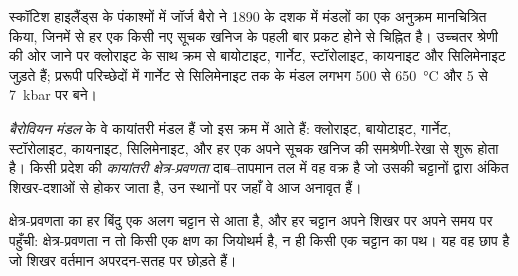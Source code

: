 स्कॉटिश हाइलैंड्स के पंकाश्मों में जॉर्ज बैरो ने 1890 के दशक में मंडलों का एक अनुक्रम
मानचित्रित किया, जिनमें से हर एक किसी नए सूचक खनिज के पहली बार प्रकट होने से चिह्नित है। उच्चतर
श्रेणी की ओर जाने पर क्लोराइट के साथ क्रम से बायोटाइट, गार्नेट, स्टॉरोलाइट, कायनाइट और सिलिमेनाइट जुड़ते हैं;
प्ररूपी परिच्छेदों में गार्नेट से सिलिमेनाइट तक के मंडल लगभग 500 से
\qty{650}{\celsius} और 5 से \qty{7}{kbar} पर बने।

\begin{definition}[बैरोवियन मंडल; कायांतरी क्षेत्र-प्रवणता]\label{def:b2:pt-paths:barrovian}
\emph{बैरोवियन मंडल}  के वे कायांतरी मंडल हैं जो
इस क्रम में आते हैं: क्लोराइट, बायोटाइट, गार्नेट, स्टॉरोलाइट, कायनाइट, सिलिमेनाइट,
और हर एक अपने सूचक खनिज की समश्रेणी-रेखा से शुरू होता है। किसी प्रदेश
की \emph{कायांतरी क्षेत्र-प्रवणता}
दाब--तापमान तल में वह वक्र है जो उसकी चट्टानों द्वारा अंकित
शिखर-दशाओं से होकर जाता है, उन स्थानों पर जहाँ वे आज अनावृत हैं।
\end{definition}

क्षेत्र-प्रवणता का हर बिंदु एक अलग चट्टान से आता है, और हर चट्टान अपने शिखर पर
अपने समय पर पहुँची: क्षेत्र-प्रवणता न तो किसी एक क्षण का जियोथर्म है, न ही
किसी एक चट्टान का पथ। यह वह छाप है जो शिखर वर्तमान अपरदन-सतह पर छोड़ते हैं।

\begin{omfigure}
\centering
{}
\par{}
\end{omfigure}

